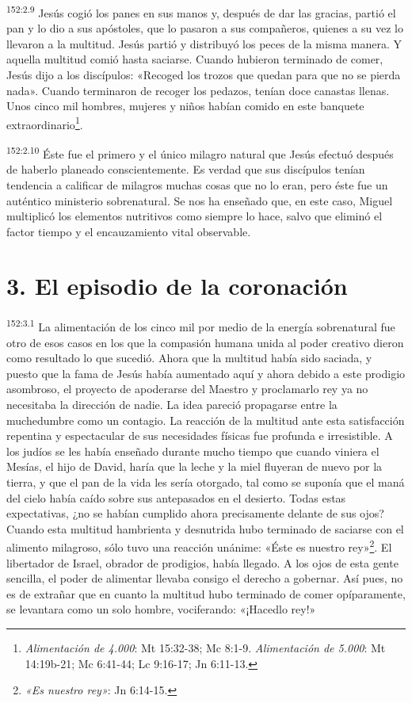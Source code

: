 \par 
\textsuperscript{152:2.9} Jesús cogió los panes en sus manos y, después de dar las gracias, partió el pan y lo dio a sus apóstoles, que lo pasaron a sus compañeros, quienes a su vez lo llevaron a la multitud. Jesús partió y distribuyó los peces de la misma manera. Y aquella multitud comió hasta saciarse. Cuando hubieron terminado de comer, Jesús dijo a los discípulos: «Recoged los trozos que quedan para que no se pierda nada». Cuando terminaron de recoger los pedazos, tenían doce canastas llenas. Unos cinco mil hombres, mujeres y niños habían comido en este banquete extraordinario\footnote{\textit{Alimentación de 4.000}: Mt 15:32-38; Mc 8:1-9. \textit{Alimentación de 5.000}: Mt 14:19b-21; Mc 6:41-44; Lc 9:16-17; Jn 6:11-13.}.

\par 
\textsuperscript{152:2.10} Éste fue el primero y el único milagro natural que Jesús efectuó después de haberlo planeado conscientemente. Es verdad que sus discípulos tenían tendencia a calificar de milagros muchas cosas que no lo eran, pero éste fue un auténtico ministerio sobrenatural. Se nos ha enseñado que, en este caso, Miguel multiplicó los elementos nutritivos como siempre lo hace, salvo que eliminó el factor tiempo y el encauzamiento vital observable.

\section*{3. El episodio de la coronación}
\par 
\textsuperscript{152:3.1} La alimentación de los cinco mil por medio de la energía sobrenatural fue otro de esos casos en los que la compasión humana unida al poder creativo dieron como resultado lo que sucedió. Ahora que la multitud había sido saciada, y puesto que la fama de Jesús había aumentado aquí y ahora debido a este prodigio asombroso, el proyecto de apoderarse del Maestro y proclamarlo rey ya no necesitaba la dirección de nadie. La idea pareció propagarse entre la muchedumbre como un contagio. La reacción de la multitud ante esta satisfacción repentina y espectacular de sus necesidades físicas fue profunda e irresistible. A los judíos se les había enseñado durante mucho tiempo que cuando viniera el Mesías, el hijo de David, haría que la leche y la miel fluyeran de nuevo por la tierra, y que el pan de la vida les sería otorgado, tal como se suponía que el maná del cielo había caído sobre sus antepasados en el desierto. Todas estas expectativas, ¿no se habían cumplido ahora precisamente delante de sus ojos? Cuando esta multitud hambrienta y desnutrida hubo terminado de saciarse con el alimento milagroso, sólo tuvo una reacción unánime: «Éste es nuestro rey»\footnote{\textit{«Es nuestro rey»}: Jn 6:14-15.}. El libertador de Israel, obrador de prodigios, había llegado. A los ojos de esta gente sencilla, el poder de alimentar llevaba consigo el derecho a gobernar. Así pues, no es de extrañar que en cuanto la multitud hubo terminado de comer opíparamente, se levantara como un solo hombre, vociferando: «¡Hacedlo rey!»

